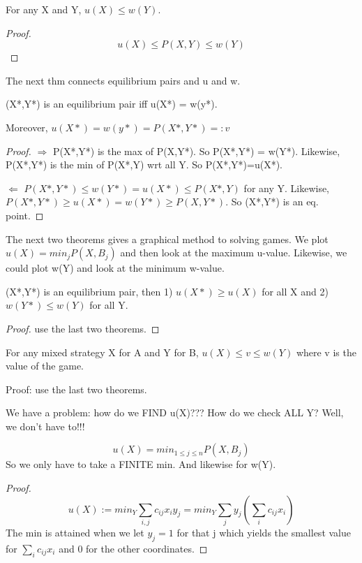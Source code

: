 \begin{theorem} 
For any X and Y, $u(X) \leq w(Y)$.
\end{theorem}

\begin{proof}
\[ u(X) \leq P(X,Y) \leq w(Y) \]
\end{proof}

The next thm connects equilibrium pairs and u and w.

\begin{theorem} 
(X*,Y*) is an equilibrium pair iff u(X*) = w(y*). 

Moreover, $u(X*) = w(y*) = P(X*,Y*) =: v$
\end{theorem}

\begin{proof}
$\Rightarrow$ P(X*,Y*) is the max of P(X,Y*). So P(X*,Y*) = w(Y*). Likewise, P(X*,Y*) is the min of P(X*,Y) wrt all Y. So P(X*,Y*)=u(X*).

$\Leftarrow$ $P(X*,Y*) \leq w(Y*) = u(X*) \leq P(X*,Y)$ for any Y. Likewise, $P(X*,Y*)  \geq u(X*) = w(Y*) \geq P(X,Y*)$. So (X*,Y*) is an eq. point.
\end{proof}

The next two theorems gives a graphical method to solving games. We plot $u(X)=min_j P(X,B_j)$ and then look at the maximum u-value. Likewise, we could plot w(Y) and look at the minimum w-value.

\begin{theorem} 
(X*,Y*) is an equilibrium pair, then 1) $u(X*) \geq u(X)$ for all X and 2) $w(Y*) \leq w(Y)$ for all Y.
\end{theorem}

\begin{proof}
use the last two theorems.
\end{proof}

\begin{corollary}
For any mixed strategy X for A and Y for B, $u(X) \leq v \leq w(Y)$ where v is the value of the game.
\end{corollary}
Proof: use the last two theorems.

We have a problem: how do we FIND u(X)??? How do we check ALL Y? Well, we don't have to!!!

\begin{theorem} 
\[u(X)=min_{1 \leq j \leq n} P(X,B_j)\]
So we only have to take a FINITE min. And likewise for w(Y).
\end{theorem}

\begin{proof}
\[u(X):=min_{Y} \sum_{i,j}  c_{ij}x_iy_j = min_Y \sum_j y_j (\sum_i c_{ij}x_i)\]
The min is attained when we let $y_j=1$ for that j which yields the smallest value for $\sum_i c_{ij}x_i$ and 0 for the other coordinates.
\end{proof}


